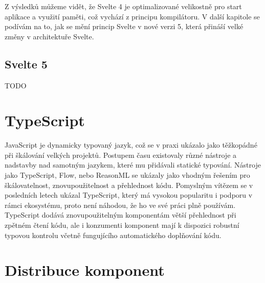 Z výsledků můžeme vidět, že Svelte 4 je optimalizované velikostně pro start aplikace a využití paměti, což vychází z principu kompilátoru.
V další kapitole se podívám na to, jak se mění princip Svelte v nové verzi 5, která přináší velké změny v architektuře Svelte.

\subsection{Svelte 5}

TODO

\section{TypeScript}

JavaScript je dynamicky typovaný jazyk, což se v praxi ukázalo jako těžkopádné při škálování velkých projektů.
Postupem času existovaly různé nástroje a nadstavby nad samotným jazykem, které mu přidávali statické typování.
Nástroje jako TypeScript, Flow, nebo ReasonML se ukázaly jako vhodným řešením pro škálovatelnost, znovupoužitelnost a přehlednost kódu.
Pomyslným vítězem se v posledních letech ukázal TypeScript, který má vysokou popularitu i podporu v rámci ekosystému, proto není náhodou, že ho ve své práci plně používám.
TypeScript dodává znovupoužitelným komponentám větší přehlednost při zpětném čtení kódu, ale i konzumenti komponent mají k dispozici robustní typovou kontrolu včetně fungujícího automatického doplňování kódu.

\section{Distribuce komponent}

